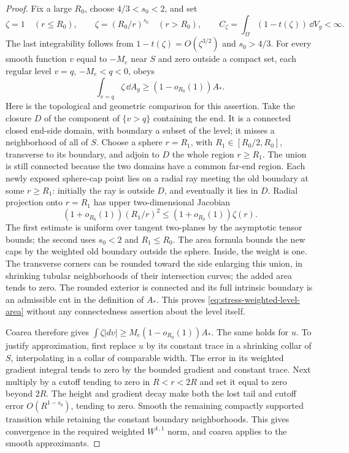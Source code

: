\begin{proof}
Fix a large $R_0$, choose $4/3<s_0<2$, and set
\begin{equation}
 \zeta=1\quad(r\le R_0),\qquad
 \zeta=(R_0/r)^{s_0}\quad(r>R_0),\qquad
 C_\zeta=\int_\Omega(1-t(\zeta))\,\dd V_g<\infty.
 \label{eq:stress-charge-weight}
\end{equation}
The last integrability follows from
$1-t(\zeta)=O(\zeta^{3/2})$ and $s_0>4/3$.
For every smooth function $v$ equal to $-M_e$ near $S$ and zero
outside a compact set, each regular level $v=q$, $-M_e<q<0$, obeys
\begin{equation}
 \int_{v=q}\zeta\,\dd A_g
 \ge(1-o_{R_0}(1))A_*.
 \label{eq:stress-weighted-level-area}
\end{equation}
Here is the topological and geometric comparison for this assertion.
Take the closure $D$ of the component of $\{v>q\}$ containing the
end.  It is a connected closed end-side domain, with boundary a
subset of the level; it misses a neighborhood of all of $S$.
Choose a sphere $r=R_1$, with $R_1\in[R_0/2,R_0]$, transverse to its
boundary, and adjoin to $D$ the whole region $r\ge R_1$.
The union is still connected because the two domains have a common
far-end region.  Each newly exposed sphere-cap point lies on a
radial ray meeting the old boundary at some $r\ge R_1$: initially
the ray is outside $D$, and eventually it lies in $D$.
Radial projection onto $r=R_1$ has upper two-dimensional Jacobian
\[
 (1+o_{R_0}(1))(R_1/r)^2
 \le(1+o_{R_0}(1))\zeta(r).
\]
The first estimate is uniform over tangent two-planes by the
asymptotic tensor bounds; the second uses $s_0<2$ and $R_1\le R_0$.
The area formula bounds the new caps by the weighted old boundary
outside the sphere.  Inside, the weight is one.  The transverse
corners can be rounded toward the side enlarging this union, in
shrinking tubular neighborhoods of their intersection curves; the
added area tends to zero.  The rounded exterior is connected and
its full intrinsic boundary is an admissible cut in the definition
of $A_*$.  This proves \eqref{eq:stress-weighted-level-area} without
any connectedness assertion about the level itself.

Coarea therefore gives
$\int\zeta|dv|\ge M_e(1-o_{R_0}(1))A_*$.
The same holds for $u$.  To justify approximation, first replace
$u$ by its constant trace in a shrinking collar of $S$, interpolating
in a collar of comparable width.  The error in its weighted gradient
integral tends to zero by the bounded gradient and constant trace.
Next multiply by a cutoff tending to zero in $R<r<2R$ and set it
equal to zero beyond $2R$.  The height and gradient decay make both
the lost tail and cutoff error $O(R^{1-s_0})$, tending to zero.
Smooth the remaining compactly supported transition while retaining
the constant boundary neighborhoods.  This gives convergence in
the required weighted $W^{1,1}$ norm, and coarea applies to the
smooth approximants.


\end{proof}
